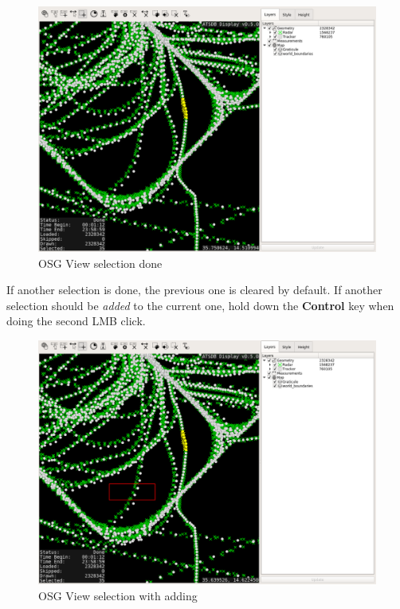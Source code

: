 \begin{figure}[H]
    \hspace*{-2.5cm}
    \includegraphics[width=19cm,frame]{../screenshots/osgview_select2.png}
  \caption{OSG View selection done}
\end{figure}

If another selection is done, the previous one is cleared by default. If another selection should be \textit{added} to the current one, hold down the \textbf{Control} key when doing the second LMB click.

\begin{figure}[H]
    \hspace*{-2.5cm}
    \includegraphics[width=19cm,frame]{../screenshots/osgview_select_add1.png}
  \caption{OSG View selection with adding}
\end{figure}

